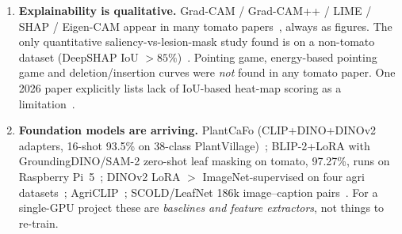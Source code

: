 \begin{enumerate}
  \item \textbf{Explainability is qualitative.} Grad-CAM / Grad-CAM++ / LIME / SHAP / Eigen-CAM appear in many tomato papers~\cite{xsetomatonet,leafdet,gunasekaran2026}, always as figures. The only quantitative saliency-vs-lesion-mask study found is on a non-tomato dataset (DeepSHAP IoU $>85\%$)~\cite{shafik2025xai}. Pointing game, energy-based pointing game and deletion/insertion curves were \emph{not} found in any tomato paper. One 2026 paper explicitly lists lack of IoU-based heat-map scoring as a limitation~\cite{scirep2026xai}.
  \item \textbf{Foundation models are arriving.} PlantCaFo (CLIP+DINO+DINOv2 adapters, 16-shot 93.5\% on 38-class PlantVillage)~\cite{plantcafo}; BLIP-2+LoRA with GroundingDINO/SAM-2 zero-shot leaf masking on tomato, 97.27\%, runs on Raspberry Pi~5~\cite{kaur2025}; DINOv2 LoRA $>$ ImageNet-supervised on four agri datasets~\cite{espejo2025}; AgriCLIP~\cite{agriclip}; SCOLD/LeafNet 186k image--caption pairs~\cite{scold}. For a single-GPU project these are \emph{baselines and feature extractors}, not things to re-train.
\end{enumerate}

